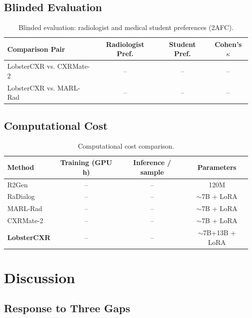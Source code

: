 \documentclass[runningheads,10pt]{llncs}
\begin{document}
\subsection{Blinded Evaluation}

\begin{table}[t]
\centering
\caption{Blinded evaluation: radiologist and medical student preferences (2AFC).}
\label{tab:blind}
\small
\begin{tabular}{lCCC}
\toprule
Comparison Pair & Radiologist Pref. & Student Pref. & Cohen's $\kappa$ \\
\midrule
LobsterCXR vs. CXRMate-2 & -- & -- & -- \\
LobsterCXR vs. MARL-Rad & -- & -- & -- \\
\bottomrule
\end{tabular}
\end{table}

\subsection{Computational Cost}

\begin{table}[t]
\centering
\caption{Computational cost comparison.}
\label{tab:cost}
\small
\begin{tabular}{lCCC}
\toprule
Method & Training (GPU h) & Inference / sample & Parameters \\
\midrule
R2Gen & -- & -- & 120M \\
RaDialog & -- & -- & $\sim$7B + LoRA \\
MARL-Rad & -- & -- & $\sim$7B + LoRA \\
CXRMate-2 & -- & -- & $\sim$7B + LoRA \\
\textbf{LobsterCXR} & -- & -- & $\sim$7B+13B + LoRA \\
\bottomrule
\end{tabular}
\end{table}

\section{Discussion}

\subsection{Response to Three Gaps}
\end{document}
